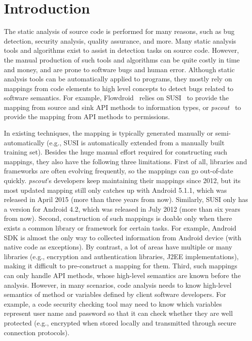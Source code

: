 \section{Introduction}

The static analysis of source code is performed for many reasons, such as bug detection, security analysis, quality assurance, and more. Many static analysis tools and algorithms exist to assist in detection tasks on source code. However, the manual production of such tools and algorithms can be quite costly in time and money, and are prone to software bugs and human error. Although static analysis tools can be automatically applied to programs, they mostly rely on mappings from code elements to high level concepts to detect bugs related to software semantics. For example, Flowdroid~\cite{} relies on SUSI~\cite{} to provide the mapping from source and sink API methods to information types, or \textit{pscout}~\cite{} to provide the mapping from API methods to permissions. 


In existing techniques, the mapping is typically generated manually or semi-automatically (e.g., SUSI is automatically extended from a manually built training set). Besides the huge manual effort required for constructing such mappings, they also have the following three limitations. First of all, libraries and frameworks are often evolving frequently, so the mappings can go out-of-date quickly. \textit{pscout}'s developers keep maintaining their mappings since 2012, but its most updated mapping still only catches up with Android 5.1.1, which was released in April 2015 (more than three years from now). Similarly, SUSI only has a version for Android 4.2, which was released in July 2012 (more than six years from now). Second, construction of such mappings is doable only when there exists a common library or framework for certain tasks. For example,  Android SDK is almost the only way to collected information from Android device (with native code as exceptions). By contrast, a lot of areas have multiple or many libraries (e.g., encryption and authentication libraries, J2EE implementations), making it difficult to pre-construct a mapping for them. Third, such mappings can only handle API methods, whose high-level semantics are known before the analysis. However, in many scenarios, code analysis needs to know high-level semantics of method or variables defined by client software developers. For example, a code security checking tool may need to know which variables represent user name and password so that it can check whether they are well protected (e.g., encrypted when stored locally and transmitted through secure connection protocols).  

